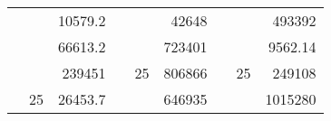 \begin{table}[H]
\begin{tabular}{|ccrccrccc}
\rowcolor[HTML]{DAE8FC} 
\multicolumn{1}{|c|}{\cellcolor[HTML]{FFFFC7}}                                & \multicolumn{1}{c|}{\cellcolor[HTML]{DAE8FC}}                      & \multicolumn{1}{r|}{\cellcolor[HTML]{DAE8FC}10579.2}   & \multicolumn{1}{c|}{\cellcolor[HTML]{FFFFC7}}                                & \multicolumn{1}{c|}{\cellcolor[HTML]{DAE8FC}}                       & \multicolumn{1}{r|}{\cellcolor[HTML]{DAE8FC}42648}     & \multicolumn{1}{c|}{\cellcolor[HTML]{FFFFC7}}                                & \multicolumn{1}{c|}{\cellcolor[HTML]{DAE8FC}}                      & \multicolumn{1}{r|}{\cellcolor[HTML]{DAE8FC}493392}    \\ \cline{3-3} \cline{6-6} \cline{9-9} 
\multicolumn{1}{|c|}{\cellcolor[HTML]{FFFFC7}}                                & \multicolumn{1}{c|}{\cellcolor[HTML]{DAE8FC}}                      & \multicolumn{1}{r|}{\cellcolor[HTML]{DDFDFF}66613.2}   & \multicolumn{1}{c|}{\cellcolor[HTML]{FFFFC7}}                                & \multicolumn{1}{c|}{\cellcolor[HTML]{DAE8FC}}                       & \multicolumn{1}{r|}{\cellcolor[HTML]{DDFDFF}723401}    & \multicolumn{1}{c|}{\cellcolor[HTML]{FFFFC7}}                                & \multicolumn{1}{c|}{\cellcolor[HTML]{DAE8FC}}                      & \multicolumn{1}{r|}{\cellcolor[HTML]{DDFDFF}9562.14}   \\ \cline{3-3} \cline{6-6} \cline{9-9} 
\rowcolor[HTML]{DAE8FC} 
\multicolumn{1}{|c|}{\cellcolor[HTML]{FFFFC7}}                                & \multicolumn{1}{c|}{\cellcolor[HTML]{DAE8FC}}                      & \multicolumn{1}{r|}{\cellcolor[HTML]{DAE8FC}239451}    & \multicolumn{1}{c|}{\cellcolor[HTML]{FFFFC7}}                                & \multicolumn{1}{c|}{\multirow{-9}{*}{\cellcolor[HTML]{DAE8FC}25}}   & \multicolumn{1}{r|}{\cellcolor[HTML]{DAE8FC}806866}    & \multicolumn{1}{c|}{\cellcolor[HTML]{FFFFC7}}                                & \multicolumn{1}{c|}{\multirow{-9}{*}{\cellcolor[HTML]{DAE8FC}25}}  & \multicolumn{1}{r|}{\cellcolor[HTML]{DAE8FC}249108}    \\ \cline{3-3} \cline{5-6} \cline{8-9} 
\multicolumn{1}{|c|}{\cellcolor[HTML]{FFFFC7}}                                & \multicolumn{1}{c|}{\multirow{-10}{*}{\cellcolor[HTML]{DAE8FC}25}} & \multicolumn{1}{r|}{\cellcolor[HTML]{DDFDFF}26453.7}   & \multicolumn{1}{c|}{\cellcolor[HTML]{FFFFC7}}                                & \multicolumn{1}{c|}{\cellcolor[HTML]{DDFDFF}}                       & \multicolumn{1}{r|}{\cellcolor[HTML]{DAE8FC}646935}    & \multicolumn{1}{c|}{\cellcolor[HTML]{FFFFC7}}                                & \multicolumn{1}{c|}{\cellcolor[HTML]{DDFDFF}}                      & \multicolumn{1}{r|}{\cellcolor[HTML]{DAE8FC}1015280}   \\ \cline{2-3} \cline{6-6} \cline{9-9} 

\end{tabular}
\end{table}
